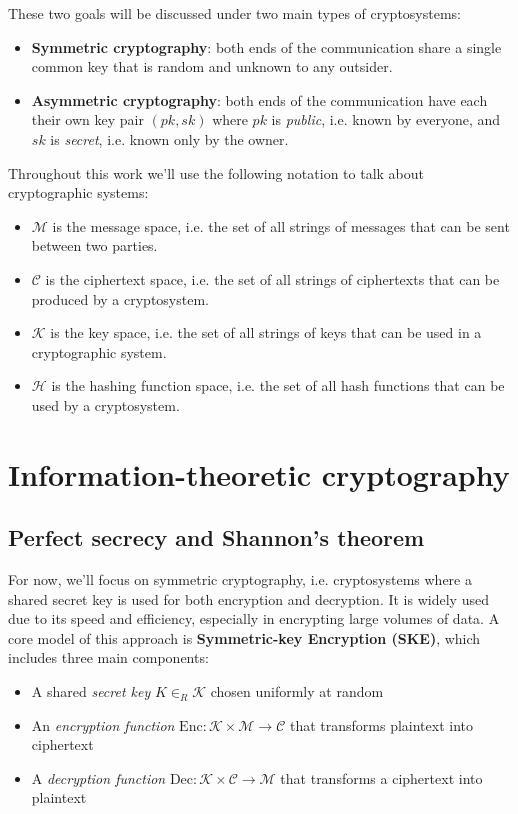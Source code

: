 \documentclass[a4paper, 12pt]{report}
\begin{document}
    These two goals will be discussed under two main types of cryptosystems:
    \begin{itemize}
        \item \textbf{Symmetric cryptography}: both ends of the communication share a single common key that is random and unknown to any outsider.
        \item \textbf{Asymmetric cryptography}: both ends of the communication have each their own key pair $(pk, sk)$ where $pk$ is \textit{public}, i.e. known by everyone, and $sk$ is \textit{secret}, i.e. known only by the owner. 
    \end{itemize}

    Throughout this work we'll use the following notation to talk about cryptographic systems:
    \begin{itemize}
        \item $\mathcal{M}$ is the message space, i.e. the set of all strings of messages that can be sent between two parties.
        \item $\mathcal{C}$ is the ciphertext space, i.e. the set of all strings of ciphertexts that can be produced by a cryptosystem.
        \item $\mathcal{K}$ is the key space, i.e. the set of all strings of keys that can be used in a cryptographic system.
        \item $\mathcal{H}$ is the hashing function space, i.e. the set of all hash functions that can be used by a cryptosystem.
    \end{itemize}

    \chapter{Information-theoretic cryptography}

    \section{Perfect secrecy and Shannon's theorem}

    For now, we'll focus on symmetric cryptography, i.e. cryptosystems where a shared secret key is used for both encryption and decryption. It is widely used due to its speed and efficiency, especially in encrypting large volumes of data. A core model of this approach is \textbf{Symmetric-key Encryption (SKE)}, which includes three main components:
    \begin{itemize}
        \item A shared \textit{secret key} $K \in_{R} \mathcal{K}$ chosen uniformly at random
        \item An \textit{encryption function} $\mathrm{Enc} : \mathcal{K} \times \mathcal{M} \to \mathcal{C}$ that transforms plaintext into ciphertext
        \item A \textit{decryption function} $\mathrm{Dec} : \mathcal{K} \times \mathcal{C} \to \mathcal{M}$ that transforms a ciphertext into plaintext
    \end{itemize}
\end{document}
